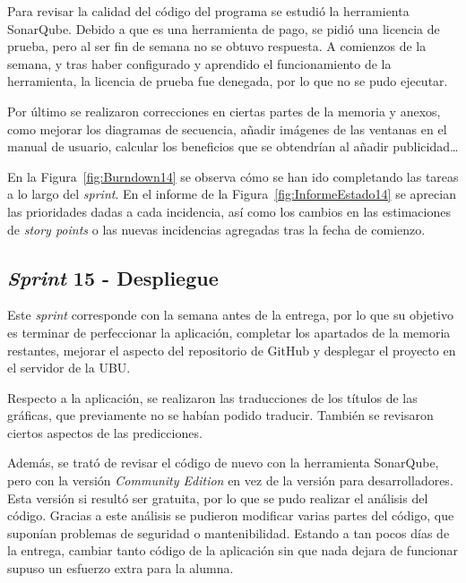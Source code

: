 Para revisar la calidad del código del programa se estudió la herramienta SonarQube. Debido a que es una herramienta de pago, se pidió una licencia de prueba, pero al ser fin de semana no se obtuvo respuesta. A comienzos de la semana, y tras haber configurado y aprendido el funcionamiento de la herramienta, la licencia de prueba fue denegada, por lo que no se pudo ejecutar.

Por último se realizaron correcciones en ciertas partes de la memoria y anexos, como mejorar los diagramas de secuencia, añadir imágenes de las ventanas en el manual de usuario, calcular los beneficios que se obtendrían al añadir publicidad\ldots

En la Figura~\ref{fig:Burndown14} se observa cómo se han ido completando las tareas a lo largo del \textit{sprint}.
En el informe de la Figura~\ref{fig:InformeEstado14} se aprecian las prioridades dadas a cada incidencia, así como los cambios en las estimaciones de \textit{story points} o las nuevas incidencias agregadas tras la fecha de comienzo.



\subsection{\textit{Sprint} 15 - Despliegue}
Este \textit{sprint} corresponde con la semana antes de la entrega, por lo que su objetivo es terminar de perfeccionar la aplicación, completar los apartados de la memoria restantes, mejorar el aspecto del repositorio de GitHub y desplegar el proyecto en el servidor de la UBU.

Respecto a la aplicación, se realizaron las traducciones de los títulos de las gráficas, que previamente no se habían podido traducir. 
También se revisaron ciertos aspectos de las predicciones.

Además, se trató de revisar el código de nuevo con la herramienta SonarQube, pero con la versión \textit{Community Edition} en vez de la versión para desarrolladores. Esta versión si resultó ser gratuita, por lo que se pudo realizar el análisis del código. Gracias a este análisis se pudieron modificar varias partes del código, que suponían problemas de seguridad o mantenibilidad. Estando a tan pocos días de la entrega, cambiar tanto código de la aplicación sin que nada dejara de funcionar supuso un esfuerzo extra para la alumna.

